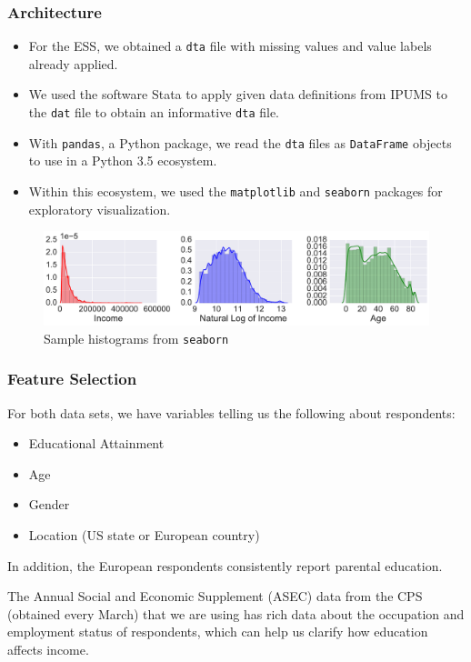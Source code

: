\documentclass{beamer}
\let\olditem=\item
\renewcommand{\item}{\olditem \justifying}
\begin{document}
\frame %
{
  \frametitle{Architecture}
  \begin{itemize}
  \item For the ESS, we obtained a \texttt{dta} file with missing values and value labels already applied.
  \item We used the software Stata to apply given data definitions from IPUMS to the \texttt{dat} file to obtain an informative \texttt{dta} file.  
  \item With \texttt{pandas}, a Python package, we read the \texttt{dta} files as \texttt{DataFrame} objects to use in a Python 3.5 ecosystem. 
  \item Within this ecosystem, we used the \texttt{matplotlib} and \texttt{seaborn} packages for exploratory visualization.
  \end{itemize}

\begin{figure}[htbp]
\begin{center}
\includegraphics[width=\textwidth]{example_histograms.pdf}

\caption{Sample histograms from \texttt{seaborn}}
\label{histograms}
\end{center}
\end{figure}

  
}

\frame %
{
  \frametitle{Feature Selection}
  For both data sets, we have variables telling us the following about respondents:
  \begin{itemize}
  \item Educational Attainment
  \item Age
  \item Gender
  \item Location (US state or European country) 
  \end{itemize}
  In addition, the European respondents consistently report parental education. 
  
  The Annual Social and Economic Supplement (ASEC) data from the CPS (obtained every March) that we are using has rich data about the occupation and employment status of respondents, which can help us clarify how education affects income.
}
\end{document}
